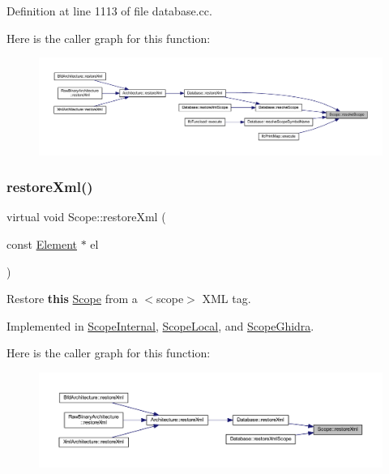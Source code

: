 Definition at line 1113 of file database.\+cc.

Here is the caller graph for this function\+:
\nopagebreak
\begin{figure}[H]
\begin{center}
\leavevmode
\includegraphics[width=350pt]{class_scope_a3b252ca0ce3155c06fe0cee6eae9265b_icgraph}
\end{center}
\end{figure}
\mbox{\label{class_scope_ad509027899b5f6af11f499f722d61f66}} 
\subsubsection{\texorpdfstring{restoreXml()}{restoreXml()}}
{\footnotesize\ttfamily virtual void Scope\+::restore\+Xml (\begin{DoxyParamCaption}\item[{const \mbox{\hyperlink{class_element}{Element}} $\ast$}]{el }\end{DoxyParamCaption})\hspace{0.3cm}{\ttfamily [pure virtual]}}



Restore {\bfseries{this}} \mbox{\hyperlink{class_scope}{Scope}} from a $<$scope$>$ X\+ML tag. 



Implemented in \mbox{\hyperlink{class_scope_internal_ad79bd78299b2bea6c0f4221682e81b07}{Scope\+Internal}}, \mbox{\hyperlink{class_scope_local_a5eeb1756bc706b8d5211fda106ad82ae}{Scope\+Local}}, and \mbox{\hyperlink{class_scope_ghidra_ad6efdd1eb3b3189dc6020a0440128be3}{Scope\+Ghidra}}.

Here is the caller graph for this function\+:
\nopagebreak
\begin{figure}[H]
\begin{center}
\leavevmode
\includegraphics[width=350pt]{class_scope_ad509027899b5f6af11f499f722d61f66_icgraph}
\end{center}
\end{figure}
\mbox{\label{class_scope_a21556c257fbea888f9004c654599dfe9}} 
